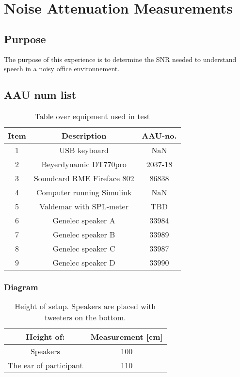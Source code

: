 \section{Noise Attenuation Measurements}

\subsection{Purpose}

The purpose of this experience is to determine the SNR needed to understand speech in a noisy office environnement.  

\subsection{AAU num list}

\begin{table}[h]
	\centering
	
	\begin{tabular}{ c c c } \toprule
		{Item} & {Description} & {AAU-no}. \\ \bottomrule 
		1      	&  USB keyboard							& NaN		\\
		2      	&  Beyerdynamic DT770pro				& 2037-18	\\
		3      	&  Soundcard RME Fireface 802           & 86838		\\
		4      	&  Computer	running Simulink			& NaN		\\  
		5		&  Valdemar with SPL-meter				& TBD		\\
		6      	&  Genelec speaker A					& 33984		\\
		7      	&  Genelec speaker B					& 33989		\\
		8      	&  Genelec speaker C					& 33987		\\
		9      	&  Genelec speaker D					& 33990		\\ \bottomrule 
	\end{tabular}
	\caption{Table over equipment used in test}
	\label{tab:UsedEquipmentListning1}
\end{table}



\subsubsection{Diagram}

\begin{table} [h]
	\centering
	\begin{tabular}{c c} \toprule
		\centering
		Height of:			 			& Measurement [cm] 	\\ \bottomrule
		Speakers					  	& 100				\\
		The ear of participant			& 110				\\ \bottomrule 
	\end{tabular}
	\caption{Height of setup. Speakers are placed with tweeters on the bottom.}
	\label{Tab:NoiseAttenuationDimensions}
\end{table}

